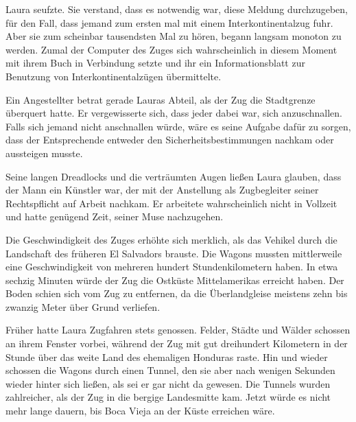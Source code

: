 \par

Laura seufzte. Sie verstand, dass es notwendig war, diese Meldung durchzugeben, für den Fall, dass jemand zum ersten mal mit einem Interkontinentalzug fuhr. Aber sie zum scheinbar tausendsten Mal zu hören, begann langsam monoton zu werden. Zumal der Computer des Zuges sich wahrscheinlich in diesem Moment mit ihrem Buch in Verbindung setzte und ihr ein Informationsblatt zur Benutzung von Interkontinentalzügen übermittelte.

\par

Ein Angestellter betrat gerade Lauras Abteil, als der Zug die Stadtgrenze überquert hatte. Er vergewisserte sich, dass jeder dabei war, sich anzuschnallen. Falls sich jemand nicht anschnallen würde, wäre es seine Aufgabe dafür zu sorgen, dass der Entsprechende entweder den Sicherheitsbestimmungen nachkam oder aussteigen musste.

\par

Seine langen Dreadlocks und die verträumten Augen ließen Laura glauben, dass der Mann ein Künstler war, der mit der Anstellung als Zugbegleiter seiner Rechtspflicht auf Arbeit nachkam. Er arbeitete wahrscheinlich nicht in Vollzeit und hatte genügend Zeit, seiner Muse nachzugehen.

\par

Die Geschwindigkeit des Zuges erhöhte sich merklich, als das Vehikel durch die Landschaft des früheren El Salvadors brauste. Die Wagons mussten mittlerweile eine Geschwindigkeit von mehreren hundert Stundenkilometern haben. In etwa sechzig Minuten würde der Zug die Ostküste Mittelamerikas erreicht haben. Der Boden schien sich vom Zug zu entfernen, da die Überlandgleise meistens zehn bis zwanzig Meter über Grund verliefen.

\par

Früher hatte Laura Zugfahren stets genossen. Felder, Städte und Wälder schossen an ihrem Fenster vorbei, während der Zug mit gut dreihundert Kilometern in der Stunde über das weite Land des ehemaligen Honduras raste. Hin und wieder schossen die Wagons durch einen Tunnel, den sie aber nach wenigen Sekunden wieder hinter sich ließen, als sei er gar nicht da gewesen. Die Tunnels wurden zahlreicher, als der Zug in die bergige Landesmitte kam. Jetzt würde es nicht mehr lange dauern, bis Boca Vieja an der Küste erreichen wäre.

